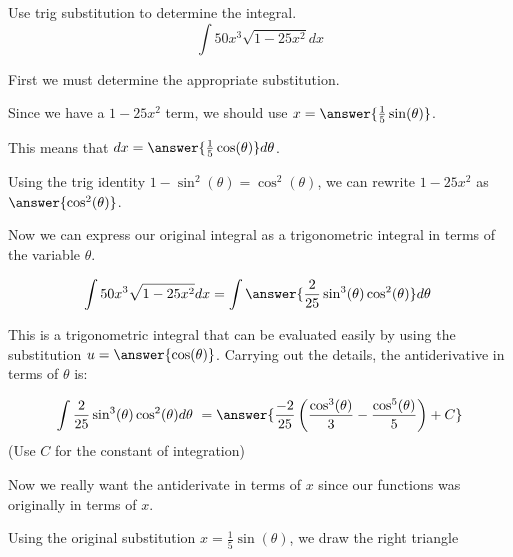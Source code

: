 \documentclass{ximera}
\author{Jason Miller}
\begin{document}
\begin{exercise}
Use trig substitution to determine the integral.
\[
\int 50 x^{3} \sqrt{1-25x^{2}} dx
\]

First we must determine the appropriate substitution. 

Since we have a $1-25x^{2}$ term, we should use $x=\answer{\frac{1}{5}\sin(\theta)}$. 

This means that $dx= \answer{\frac{1}{5}\cos(\theta)} d\theta$. 

\begin{exercise}
Using the trig identity $1-\sin^{2}(\theta)=\cos^{2}(\theta)$, we can rewrite $1-25x^{2}$ as $\answer{\cos^{2}(\theta)}$. 

Now we can express our original integral as a trigonometric integral in terms of the variable $\theta$. 

\[
\int  50 x^{3} \sqrt{1-25x^{2}} dx= \int \answer{  \frac{2}{25} \sin^{3}(\theta) \cos^{2}(\theta)  } d\theta\
\]

This is a trigonometric integral that can be evaluated easily by using the substitution $u = \answer{\cos(\theta)}$.  Carrying out the details, the antiderivative in terms of $\theta$ is: 

\[
\int \frac{2}{25} \sin^{3}(\theta) \cos^{2}(\theta)   d\theta\ = \answer{ \frac{-2}{25}\left( \frac{\cos^{3}(\theta)}{3} -\frac{\cos^{5}(\theta)}{5} \right) + C}
\]
(Use $C$ for the constant of integration)


Now we really want the antiderivate in terms of $x$ since our functions was originally in terms of $x$. 

\begin{exercise}
Using the original substitution $x=\frac{1}{5}\sin(\theta)$, we draw the right triangle 

    \begin{image}
    \end{image}


\end{exercise}
\end{exercise}
\end{exercise}
\end{document}
